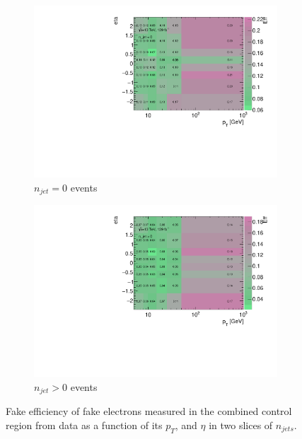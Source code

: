 \begin{figure}[!htb]
    \begin{center}
        \begin{subfigure}{.48\textwidth}
            \centering
            \includegraphics[width=.95\linewidth]{figures/Analysis/Background/njet0_FakeEfficiency3D_el_pt_eta.pdf}
            \caption{$n_{jet}=0$ events \label{fig:FakeEff_3D_Elec_njet0}}
        \end{subfigure}
        \begin{subfigure}{.48\textwidth}
            \centering
            \includegraphics[width=.95\linewidth]{figures/Analysis/Background/njet1_FakeEfficiency3D_el_pt_eta.pdf}
            \caption{$n_{jet}>0$ events \label{fig:FakeEff_3D_Elec_njet1}}
        \end{subfigure}
    \end{center}
    \caption{Fake efficiency of fake electrons measured in the combined control region from data as a function of its $p_{T}$, and $\eta$ in two slices of $n_{jets}$. \label{fig:ElecFakeEff}}
\end{figure}

